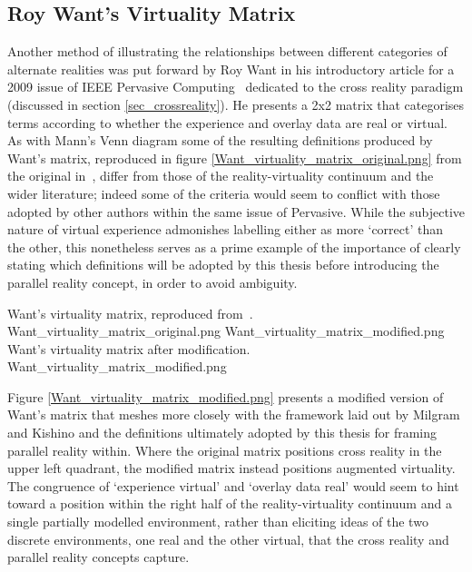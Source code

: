 \subsection{Roy Want's Virtuality Matrix}
\label{roy-wants-virtuality-matrix}
Another method of illustrating the relationships between different categories of alternate realities was put forward by Roy Want in his introductory article for a 2009 issue of IEEE Pervasive Computing~\cite{Want2009} dedicated to the cross reality paradigm (discussed in section \ref{sec_crossreality}). He presents a 2x2 matrix that categorises terms according to whether the experience and overlay data are real or virtual. As with Mann's Venn diagram some of the resulting definitions produced by Want's matrix, reproduced in figure \ref{Want_virtuality_matrix_original.png} from the original in~\cite{Want2009}, differ from those of the reality-virtuality continuum and the wider literature; indeed some of the criteria would seem to conflict with those adopted by other authors within the same issue of Pervasive. While the subjective nature of virtual experience admonishes labelling either as more `correct' than the other, this nonetheless serves as a prime example of the importance of clearly stating which definitions will be adopted by this thesis before introducing the parallel reality concept, in order to avoid ambiguity.

 {Want's virtuality matrix, reproduced from~\cite{Want2009}.} {Want_virtuality_matrix_original.png}
       {Want_virtuality_matrix_modified.png} {Want's virtuality matrix after modification.} {Want_virtuality_matrix_modified.png}

Figure \ref{Want_virtuality_matrix_modified.png} presents a modified version of Want's matrix that meshes more closely with the framework laid out by Milgram and Kishino and the definitions ultimately adopted by this thesis for framing parallel reality within. Where the original matrix positions cross reality in the upper left quadrant, the modified matrix instead positions augmented virtuality. The congruence of `experience virtual' and `overlay data real' would seem to hint toward a position within the right half of the reality-virtuality continuum and a single partially modelled environment, rather than eliciting ideas of the two discrete environments, one real and the other virtual, that the cross reality and parallel reality concepts capture.

